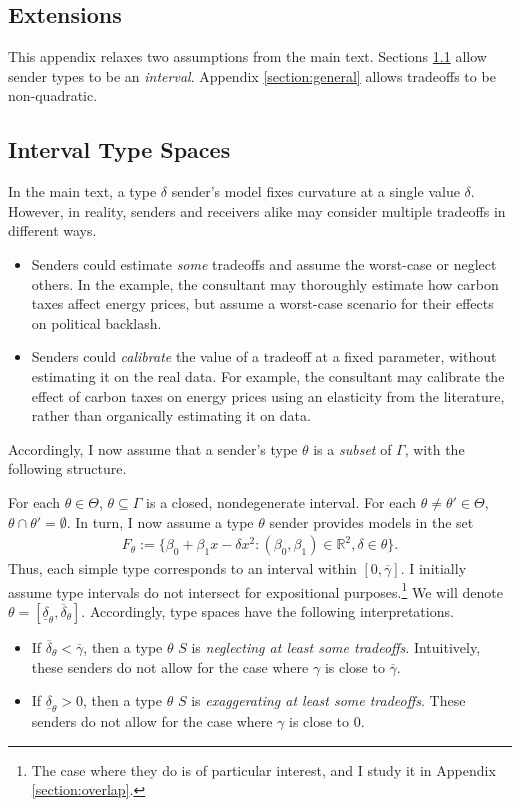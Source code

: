 \documentclass[11pt,dvipsnames]{article}
\begin{document}
\begin{appendix}
\section{Extensions}\label{appendix:extensions}
This appendix relaxes two assumptions from the main text.
Sections \ref{section:intervals} allow sender types to be an \emph{interval}.
Appendix \ref{section:general} allows tradeoffs to be non-quadratic.

\subsection{Interval Type Spaces}\label{section:intervals}
In the main text, a type $\delta$ sender's model fixes curvature at a single value $\delta$.
However, in reality, senders and receivers alike may consider multiple tradeoffs in different ways.
\begin{itemize}
\item Senders could estimate \emph{some} tradeoffs and assume the worst-case or neglect others. In the example, the consultant may thoroughly estimate how carbon taxes affect energy prices, but assume a worst-case scenario for their effects on political backlash. 
\item Senders could \emph{calibrate} the value of a tradeoff at a fixed parameter, without estimating it on the real data. For example, the consultant may calibrate the effect of carbon taxes on energy prices using an elasticity from the literature, rather than organically estimating it on data.
\end{itemize}
Accordingly, I now assume that a sender's type $\theta$ is a \emph{subset} of $\Gamma$, with the following structure.

For each $\theta \in \Theta$, $\theta \subseteq \Gamma$ is a closed, nondegenerate interval. 
For each $\theta \neq \theta' \in \Theta$, $\theta \cap \theta' = \emptyset$.
In turn, I now assume a type $\theta$ sender provides models in the set
\begin{align*}
F_\theta := \{\beta_0+\beta_1x-\delta x^2 : (\beta_0,\beta_1) \in \mathbb{R}^2, \delta \in \theta\}.
\end{align*}
Thus, each simple type corresponds to an interval within $[0,\overline{\gamma}]$. 
I initially assume type intervals do not intersect for expositional purposes.\footnote{The case where they do is of particular interest, and I study it in Appendix \ref{section:overlap}.}
We will denote $\theta = [\underline{\delta}_\theta,\overline{\delta}_\theta]$.
Accordingly, type spaces have the following interpretations.
\begin{itemize}
\item If $\overline{\delta}_\theta < \overline{\gamma}$, then a type $\theta$ $S$ is \emph{neglecting at least some tradeoffs}. Intuitively, these senders do not allow for the case where $\gamma$ is close to $\overline{\gamma}$.
\item If $\underline{\delta}_\theta > 0$, then a type $\theta$ $S$ is \emph{exaggerating at least some tradeoffs}. These senders do not allow for the case where $\gamma$ is close to $0$.
\end{itemize}


\end{appendix}
\end{document}
